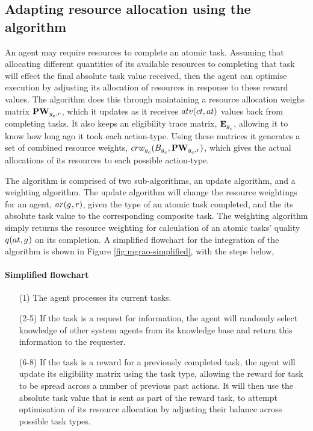 \subsection{Adapting resource allocation using the \acronymMGRAO{}{} algorithm}
\label{section:solution_mgrao}

An agent may require resources to complete an atomic task. Assuming that allocating different quantities of its available resources to completing that task will effect the final absolute task value received, then the agent can optimise execution by adjusting its allocation of  resources in response to these reward values. The \acronymMGRAO{}{} algorithm does this through maintaining a resource allocation weighs matrix $\matrixResourceWeight{}{}$, which it updates as it receives $\functionTaskAbsoluteValue{}{}$ values back from completing tasks. It also keeps an eligibility trace matrix, $\matrixEligibilityTrace{}{}$, allowing it to know how long ago it took each action-type. Using these matrices it generates a set of combined resource weights, $\functionCombinedResourceWeightsSignature{}{}$, which gives the actual allocations of its resources to each possible action-type.

The algorithm is comprised of two sub-algorithms, an update algorithm, and a weighting algorithm. The update algorithm will change the resource weightings for an agent, $\functionAgentResources{}{}$, given the type of an atomic task completed, and the its absolute task value to the corresponding composite task. The weighting algorithm simply returns the resource weighting for calculation of an atomic tasks' quality $\functionAtomicTaskQualitySignature{}{}$ on its completion. A simplified flowchart for the integration of the \acronymMGRAO{}{} algorithm is shown in Figure \ref{fig:mgrao-simplified}, with the steps below,

 \paragraph*{Simplified \acronymMGRAO{}{} flowchart}
\begin{enumerate}

	\item[(1)] The agent processes its current tasks. 
	\item[(2-5)] If the task is a request for information, the agent will randomly select knowledge of other system agents from its knowledge base and return this information to the requester. 
	\item[(6-8)] If the task is a reward for a previously completed task, the agent will update its eligibility matrix using the task type, allowing the reward for task to be spread across a number of previous past actions. It will then use the absolute task value that is sent as part of the reward task, to attempt optimisation of its resource allocation by adjusting their balance across possible task types.  
\end{enumerate}

